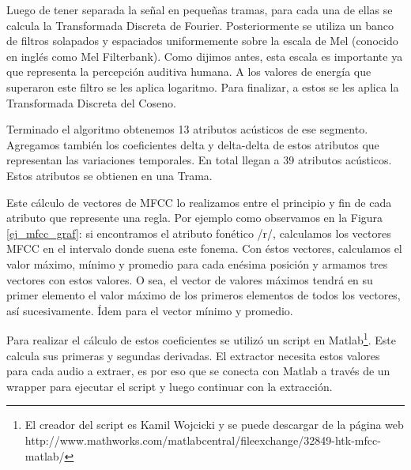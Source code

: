 Luego de tener separada la señal en pequeñas tramas, para cada una de ellas se calcula la Transformada Discreta de Fourier. Posteriormente se utiliza un banco de filtros solapados y espaciados uniformemente sobre la escala de Mel (conocido en inglés como Mel Filterbank). Como dijimos antes, esta escala es importante ya que representa la percepción auditiva humana. A los valores de energía que superaron este filtro se les aplica logaritmo. Para finalizar, a estos se les aplica la Transformada Discreta del Coseno.


Terminado el algoritmo obtenemos 13 atributos acústicos de ese segmento. Agregamos también los coeficientes delta y delta-delta de estos atributos que representan las variaciones temporales. En total llegan a 39 atributos acústicos. Estos atributos se obtienen en una Trama.

Este cálculo de vectores de MFCC lo realizamos entre el principio y fin de cada atributo que represente una regla. Por ejemplo como observamos en la Figura \ref{ej_mfcc_graf}: si encontramos el atributo fonético /r/, calculamos los vectores MFCC en el intervalo donde suena este fonema. Con éstos vectores, calculamos el valor máximo, mínimo y promedio para cada enésima posición y armamos tres vectores con estos valores. O sea, el vector de valores máximos tendrá en su primer elemento el valor máximo de los primeros elementos de todos los vectores, así sucesivamente. Ídem para el vector mínimo y promedio. 

Para realizar el cálculo de estos coeficientes se utilizó un script en Matlab\footnote{El creador del script es Kamil Wojcicki y se puede descargar de la página web http://www.mathworks.com/matlabcentral/fileexchange/32849-htk-mfcc-matlab/}. Este calcula  sus primeras y segundas derivadas. El extractor necesita estos valores para cada audio a extraer, es por eso que se conecta con Matlab a través de un wrapper para ejecutar el script y luego continuar con la extracción.

